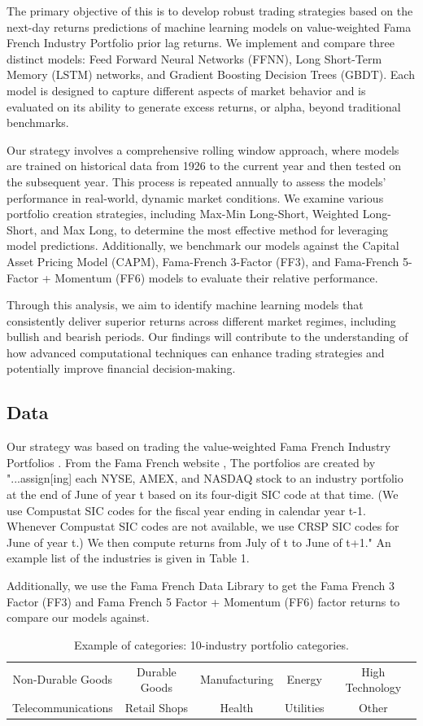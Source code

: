 \documentclass{article}
\begin{document}
The primary objective of this is to develop robust trading strategies based on the next-day returns predictions of machine learning models on value-weighted Fama French Industry Portfolio prior lag returns. We implement and compare three distinct models: Feed Forward Neural Networks (FFNN), Long Short-Term Memory (LSTM) networks, and Gradient Boosting Decision Trees (GBDT). Each model is designed to capture different aspects of market behavior and is evaluated on its ability to generate excess returns, or alpha, beyond traditional benchmarks.

Our strategy involves a comprehensive rolling window approach, where models are trained on historical data from 1926 to the current year and then tested on the subsequent year. This process is repeated annually to assess the models' performance in real-world, dynamic market conditions. We examine various portfolio creation strategies, including Max-Min Long-Short, Weighted Long-Short, and Max Long, to determine the most effective method for leveraging model predictions. Additionally, we benchmark our models against the Capital Asset Pricing Model (CAPM), Fama-French 3-Factor (FF3), and Fama-French 5-Factor + Momentum (FF6) models to evaluate their relative performance.

Through this analysis, we aim to identify machine learning models that consistently deliver superior returns across different market regimes, including bullish and bearish periods. Our findings will contribute to the understanding of how advanced computational techniques can enhance trading strategies and potentially improve financial decision-making.

\subsection{Data}
Our strategy was based on trading the value-weighted Fama French Industry Portfolios \cite{french2024}. From {the Fama French website }\cite{FrenchIndustries}, The portfolios are created by "...assign[ing] each NYSE, AMEX, and NASDAQ stock to an industry portfolio at the end of June of year t based on its four-digit SIC code at that time. (We use Compustat SIC codes for the fiscal year ending in calendar year t-1. Whenever Compustat SIC codes are not available, we use CRSP SIC codes for June of year t.) We then compute returns from July of t to June of t+1." An example list of the industries is given in Table 1.

Additionally, we use the Fama French Data Library \cite{french2024} to get the Fama French 3 Factor (FF3) and Fama French 5 Factor + Momentum (FF6) factor returns to compare our models against.
\begin{table}[H]
    \centering
    \begin{tabular}{|c c c c c|}
        Non-Durable Goods & Durable Goods & Manufacturing & Energy & High Technology \\
        Telecommunications & Retail Shops & Health & Utilities & Other 
    \end{tabular}
    \caption{Example of categories: 10-industry portfolio categories.}
    \label{tab:my_label}
\end{table}
\end{document}
